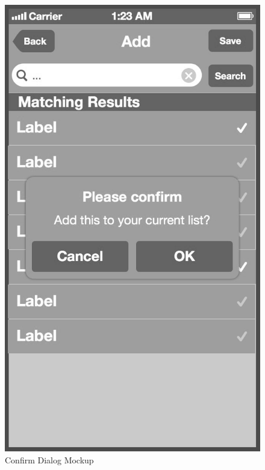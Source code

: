 \begin{figure}[!ptb]
    \begin{minipage}[b]{0.45\linewidth}
        \centering
        \includegraphics[width=0.8025\linewidth]{figures/Screen_3a_bw.jpg}
        \caption[Confirm Action Dialog]{Confirm Dialog Mockup}
        \label{fig:ConfirmDialog}
    \end{minipage}
    \hspace{0.5cm}
    \begin{minipage}[b]{0.45\linewidth}
        \centering

\end{minipage}
\end{figure}
